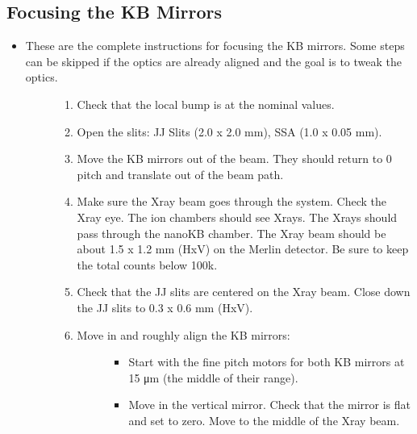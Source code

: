 \documentclass[letterpaper,10pt,english]{sphinxmanual}
\begin{document}
\subsection{Focusing the K\sphinxhyphen{}B Mirrors}
\label{\detokenize{staff:focusing-the-k-b-mirrors}}\begin{itemize}
\item {} \begin{description}
\item[{These are the complete instructions for focusing the K\sphinxhyphen{}B mirrors. Some steps can be skipped if the optics are already aligned and the goal is to tweak the optics.}] \leavevmode\begin{enumerate}
%
\item {} 
\sphinxAtStartPar
Check that the local bump is at the nominal values.

\item {} 
\sphinxAtStartPar
Open the slits: JJ Slits (2.0 x 2.0 mm), SSA (1.0 x 0.05 mm).

\item {} 
\sphinxAtStartPar
Move the K\sphinxhyphen{}B mirrors out of the beam. They should return to 0 pitch and translate out of the beam path.

\item {} 
\sphinxAtStartPar
Make sure the X\sphinxhyphen{}ray beam goes through the system. Check the X\sphinxhyphen{}ray eye. The ion chambers should see X\sphinxhyphen{}rays. The X\sphinxhyphen{}rays should pass through the nanoKB chamber. The X\sphinxhyphen{}ray beam should be about 1.5 x 1.2 mm (HxV) on the Merlin detector. Be sure to keep the total counts below 100k.

\item {} 
\sphinxAtStartPar
Check that the JJ slits are centered on the X\sphinxhyphen{}ray beam. Close down the JJ slits to 0.3 x 0.6 mm (HxV).

\item {} \begin{description}
\item[{Move in and roughly align the K\sphinxhyphen{}B mirrors:}] \leavevmode\begin{itemize}
\item {} 
\sphinxAtStartPar
Start with the fine pitch motors for both K\sphinxhyphen{}B mirrors at 15 μm (the middle of their range).

\item {} 
\sphinxAtStartPar
Move in the vertical mirror. Check that the mirror is flat and set to zero. Move to the middle of the X\sphinxhyphen{}ray beam.


\end{itemize}
\end{description}
\end{enumerate}
\end{description}
\end{itemize}
\end{document}
